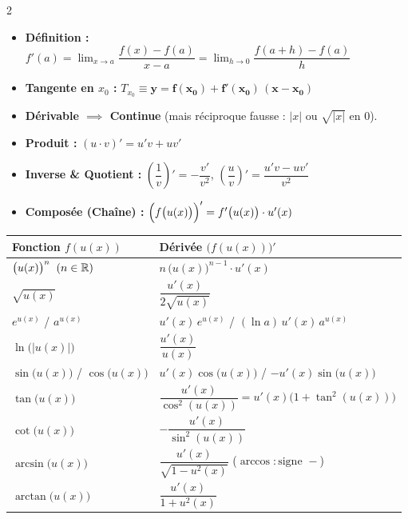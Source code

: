 {\fontsize{9.0pt}{10.8pt}\selectfont
\setlength{\columnsep}{18pt}
\begin{multicols}{2}

\begin{itemize}[leftmargin=1.2em, itemsep=1.2pt, topsep=1.5pt]
    \item \textbf{Définition :} $f'(a) = \lim_{x \to a} \dfrac{f(x) - f(a)}{x - a} = \lim_{h \to 0} \dfrac{f(a+h) - f(a)}{h}$
    \item \textbf{Tangente en $x_0$ :} $T_{x_0} \equiv \mathbf{y = f(x_0) + f'(x_0)\,(x - x_0)}$
    \item \textbf{Dérivable $\implies$ Continue} (mais réciproque fausse : $|x|$ ou $\sqrt{|x|}$ en $0$).
    \item \textbf{Produit :} $(u\cdot v)' = u'v + uv'$
    \item \textbf{Inverse \& Quotient :} $\left(\dfrac{1}{v}\right)' = -\dfrac{v'}{v^2}$, \qquad $\left(\dfrac{u}{v}\right)' = \dfrac{u'v - uv'}{v^2}$
    \item \textbf{Composée (Chaîne) :} $\Bigl(f\bigl(u(x)\bigr)\Bigr)' = f'\bigl(u(x)\bigr)\cdot u'(x)$
\end{itemize}

\vspace{2pt}
\begin{center}
\vspace{-4pt}
\renewcommand{\arraystretch}{1.35}
\setlength{\tabcolsep}{3.5pt}
\begin{tabular}{|l|l|}
\hline
\textbf{Fonction $f(u(x))$} & \textbf{Dérivée $\bigl(f(u(x))\bigr)'$} \\ \hline
$\bigl(u(x)\bigr)^n \;\; (n \in \mathbb{R})$ & $n\,\bigl(u(x)\bigr)^{n-1} \cdot u'(x)$ \\ \hline
$\sqrt{u(x)}$ & $\dfrac{u'(x)}{2\sqrt{u(x)}}$ \\ \hline
$e^{u(x)}$ \; / \; $a^{u(x)}$ & $u'(x)\,e^{u(x)}$ \; / \; $(\ln a)\,u'(x)\,a^{u(x)}$ \\ \hline
$\ln\bigl(|u(x)|\bigr)$ & $\dfrac{u'(x)}{u(x)}$ \\ \hline
$\sin\bigl(u(x)\bigr)$ / $\cos\bigl(u(x)\bigr)$ & $u'(x)\cos\bigl(u(x)\bigr)$ / $-u'(x)\sin\bigl(u(x)\bigr)$ \\ \hline
$\tan\bigl(u(x)\bigr)$ & $\dfrac{u'(x)}{\cos^2(u(x))} = u'(x)\bigl(1 + \tan^2(u(x))\bigr)$ \\ \hline
$\cot\bigl(u(x)\bigr)$ & $-\dfrac{u'(x)}{\sin^2(u(x))}$ \\ \hline
$\arcsin\bigl(u(x)\bigr)$ & $\dfrac{u'(x)}{\sqrt{1 - u^2(x)}}$ \; ($\arccos : \text{signe } -$) \\ \hline
$\arctan\bigl(u(x)\bigr)$ & $\dfrac{u'(x)}{1 + u^2(x)}$ \\ \hline
\end{tabular}
\end{center}


\end{multicols}}
